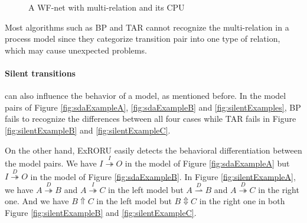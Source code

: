 \documentclass{llncs}
\begin{document}
\begin{figure}[htbp]
\centering
{}
\caption{A WF-net with multi-relation and its CPU\label{fig:exampleMultiRelation}}
\end{figure}

Most algorithms such as BP and TAR cannot recognize the multi-relation in a process model since they categorize transition pair into one type of relation, which may cause unexpected problems.

\paragraph{Silent transitions} can also influence the behavior of a model, as mentioned before. In the model pairs of Figure \ref{fig:sdaExampleA}, \ref{fig:sdaExampleB} and \ref{fig:silentExamples}, BP fails to recognize the differences between all four cases while TAR fails in Figure \ref{fig:silentExampleB} and \ref{fig:silentExampleC}. 

On the other hand, ExRORU easily detects the behavioral differentiation between the model pairs. We have $I\overset{I}{\twoheadrightarrow}O$ in the model of Figure \ref{fig:sdaExampleA} but $I\overset{D}{\twoheadrightarrow}O$ in the model of Figure \ref{fig:sdaExampleB}. In Figure \ref{fig:silentExampleA}, we have $A\overset{D}{\twoheadrightarrow}B$ and $A\overset{I}{\twoheadrightarrow}C$ in the left model but $A\overset{D}{\rightharpoonup}B$ and $A\overset{D}{\twoheadrightarrow}C$ in the right one. And we have $B\Uparrow C$ in the left model but $B\Updownarrow C$ in the right one in both Figure \ref{fig:silentExampleB} and \ref{fig:silentExampleC}.
\end{document}
